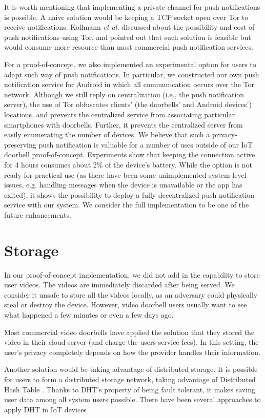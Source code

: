It is worth mentioning that implementing a private channel for push notifications is possible. A naive solution would be keeping a TCP socket open over Tor to receive notifications. Kollmann \textit{et al.} \cite{kollmann2017cost} discussed about the possibility and cost of push notifications using Tor, and pointed out that such solution is feasible but would consume more resource than most commercial push notification services.

For a proof-of-concept, we also implemented an experimental option for users to adapt such way of push notifications. In particular, we constructed our own push notification service for Android in which all communication occurs over the Tor network. Although we still reply on centralization (i.e., the push notification server), the use of Tor obfuscates clients' (the doorbells' and Android devices') locations, and prevents the centralized service from associating particular smartphones with doorbells. Further, it prevents the centralized server from easily enumerating the number of devices. We believe that such a privacy-preserving push notification is valuable for a number of uses outside of our IoT doorbell proof-of-concept. Experiments show that keeping the connection active for 4 hours consumes about 2\% of the device's battery. While the option is not ready for practical use (as there have been some unimplemented system-level issues, e.g. handling messages when the device is unavailable or the app has exited), it shows the possibility to deploy a fully decentralized push notification service with our system. We consider the full implementation to be one of the future enhancements.

\section{Storage}
In our proof-of-concept implementation, we did not add in the capability to store user videos. The videos are immediately discarded after being served. We consider it unsafe to store all the videos locally, as an adversary could physically steal or destroy the device. However, video doorbell users usually want to see what happened a few minutes or even a few days ago.

Most commercial video doorbells have applied the solution that they stored the video in their cloud server (and charge the users service fees). In this setting, the user's privacy completely depends on how the provider handles their information.

Another solution would be taking advantage of distributed storage. It is possible for users to form a distributed storage network, taking advantage of Distributed Hash Table \cite{stoica2001chord}. Thanks to DHT's property of being fault tolerant, it makes saving user data among all system users possible. There have been several approaches to apply DHT in IoT devices \cite{fabian2014privacy} \cite{paganelli2012dht}.

